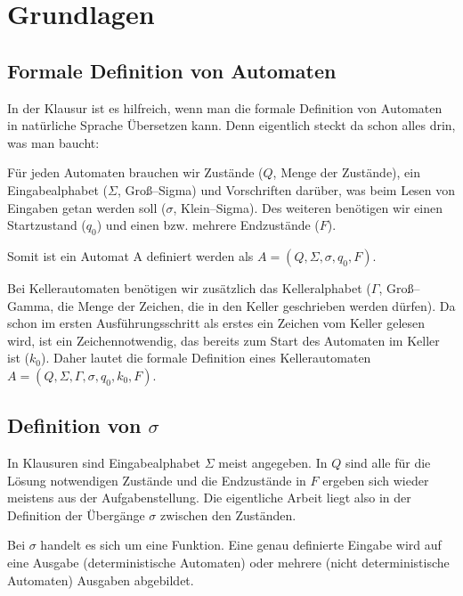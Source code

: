 \section{Grundlagen}
\label{sec:grundlagen}

\subsection{Formale Definition von Automaten}

In der Klausur ist es hilfreich, wenn man die formale Definition von Automaten in natürliche Sprache Übersetzen kann. Denn eigentlich steckt da schon alles drin, was man baucht:

Für jeden Automaten brauchen wir Zustände ($Q$, Menge der Zustände), ein Eingabealphabet ($\Sigma$, Groß--Sigma) und Vorschriften darüber, was beim Lesen von Eingaben getan werden soll ($\sigma$, Klein--Sigma). Des weiteren benötigen wir einen Startzustand ($q_0$) und einen bzw. mehrere Endzustände ($F$). 

Somit ist ein Automat A definiert werden als $A=(Q,\Sigma, \sigma, q_0, F)$.

Bei Kellerautomaten benötigen wir zusätzlich das Kelleralphabet ($\Gamma$, Groß--Gamma, die Menge der Zeichen, die in den Keller geschrieben werden dürfen). Da schon im ersten Ausführungsschritt als erstes ein Zeichen vom Keller gelesen wird, ist ein Zeichennotwendig, das bereits zum Start des Automaten im Keller ist ($k_0$). Daher lautet die formale Definition eines Kellerautomaten $A=(Q,\Sigma, \Gamma, \sigma, q_0, k_0, F)$.

\subsection{Definition von $\sigma$}

In Klausuren sind Eingabealphabet $\Sigma$ meist angegeben. In $Q$ sind alle für die Lösung notwendigen Zustände und die Endzustände in $F$ ergeben sich wieder meistens aus der Aufgabenstellung. Die eigentliche Arbeit liegt also in der Definition der Übergänge $\sigma$ zwischen den Zuständen.

Bei $\sigma$ handelt es sich um eine Funktion. Eine genau definierte Eingabe wird auf eine Ausgabe (deterministische Automaten) oder mehrere (nicht deterministische Automaten) Ausgaben abgebildet.